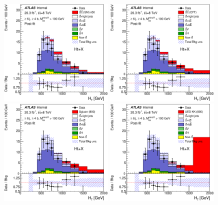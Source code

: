 \begin{figure}[!tbp]
  \centering
  \includegraphics[width=0.49\textwidth]{Analysis/Figures_HtX/4topSM_HTAll_6jetin4btaginInHmv18TeV.eps}
  \includegraphics[width=0.49\textwidth]{Analysis/Figures_HtX/4topBSM_HTAll_6jetin4btaginInHmv18TeV.eps} \\
  \includegraphics[width=0.49\textwidth]{Analysis/Figures_HtX/Sgluon800_HTAll_6jetin4btaginInHmv18TeV.eps}
  \includegraphics[width=0.49\textwidth]{Analysis/Figures_HtX/UED800_HTAll_6jetin4btaginInHmv18TeV.eps}

\end{figure}
